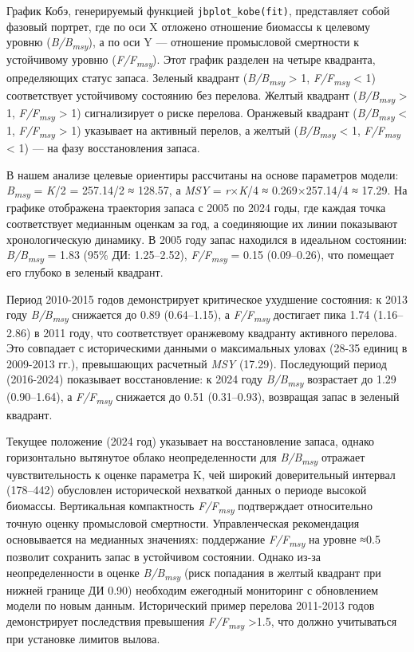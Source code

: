 \documentclass[
  letterpaper,
  DIV=11,
  numbers=noendperiod]{scrreprt}
\begin{document}
График Кобэ, генерируемый функцией \texttt{jbplot\_kobe(fit)},
представляет собой фазовый портрет, где по оси X отложено отношение
биомассы к целевому уровню (\emph{B/B\textsubscript{msy}}), а по оси Y
--- отношение промысловой смертности к устойчивому уровню
(\emph{F/F\textsubscript{msy}}). Этот график разделен на четыре
квадранта, определяющих статус запаса. Зеленый квадрант
(\emph{B/B\textsubscript{msy}} \textgreater{} 1,
\emph{F/F\textsubscript{msy}} \textless{} 1) соответствует устойчивому
состоянию без перелова. Желтый квадрант (\emph{B/B\textsubscript{msy}}
\textgreater{} 1, \emph{F/F\textsubscript{msy}} \textgreater{} 1)
сигнализирует о риске перелова. Оранжевый квадрант
(\emph{B/B\textsubscript{msy}} \textless{} 1,
\emph{F/F\textsubscript{msy}} \textgreater{} 1) указывает на активный
перелов, а желтый (\emph{B/B\textsubscript{msy}} \textless{} 1,
\emph{F/F\textsubscript{msy}} \textless{} 1) --- на фазу восстановления
запаса.

В нашем анализе целевые ориентиры рассчитаны на основе параметров
модели: \emph{B\textsubscript{msy}} = \emph{K}/2 = 257.14/2 ≈ 128.57, а
\emph{MSY} = \emph{r}×\emph{K}/4 ≈ 0.269×257.14/4 ≈ 17.29. На графике
отображена траектория запаса с 2005 по 2024 годы, где каждая точка
соответствует медианным оценкам за год, а соединяющие их линии
показывают хронологическую динамику. В 2005 году запас находился в
идеальном состоянии: \emph{B/B\textsubscript{msy}} = 1.83 (95\% ДИ:
1.25--2.52), \emph{F/F\textsubscript{msy}} = 0.15 (0.09--0.26), что
помещает его глубоко в зеленый квадрант.

Период 2010-2015 годов демонстрирует критическое ухудшение состояния: к
2013 году \emph{B/B\textsubscript{msy}} снижается до 0.89 (0.64--1.15),
а \emph{F/F\textsubscript{msy}} достигает пика 1.74 (1.16--2.86) в 2011
году, что соответствует оранжевому квадранту активного перелова. Это
совпадает с историческими данными о максимальных уловах (28-35 единиц в
2009-2013 гг.), превышающих расчетный \emph{MSY} (17.29). Последующий
период (2016-2024) показывает восстановление: к 2024 году
\emph{B/B\textsubscript{msy}} возрастает до 1.29 (0.90--1.64), а
\emph{F/F\textsubscript{msy}} снижается до 0.51 (0.31--0.93), возвращая
запас в зеленый квадрант.

Текущее положение (2024 год) указывает на восстановление запаса, однако
горизонтально вытянутое облако неопределенности для
\emph{B/B\textsubscript{msy}} отражает чувствительность к оценке
параметра K, чей широкий доверительный интервал (178--442) обусловлен
исторической нехваткой данных о периоде высокой биомассы. Вертикальная
компактность \emph{F/F\textsubscript{msy}} подтверждает относительно
точную оценку промысловой смертности. Управленческая рекомендация
основывается на медианных значениях: поддержание
\emph{F/F\textsubscript{msy}} на уровне ≈0.5 позволит сохранить запас в
устойчивом состоянии. Однако из-за неопределенности в оценке
\emph{B/B\textsubscript{msy}} (риск попадания в желтый квадрант при
нижней границе ДИ 0.90) необходим ежегодный мониторинг с обновлением
модели по новым данным. Исторический пример перелова 2011-2013 годов
демонстрирует последствия превышения \emph{F/F\textsubscript{msy}}
\textgreater1.5, что должно учитываться при установке лимитов вылова.
\end{document}
